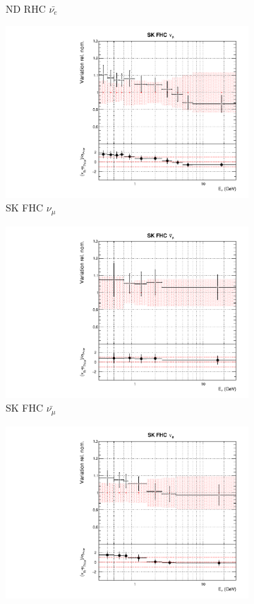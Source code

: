 \begin{figure}
\begin{subfigure}{0.24\textwidth}
  \caption{ND RHC $\bar{\nu_e}$}
\end{subfigure}
\begin{subfigure}{0.24\textwidth}
  \centering
  \includegraphics[width=0.95\linewidth]{figs/datflux8}
  \caption{SK FHC $\nu_{\mu}$}
\end{subfigure}
\begin{subfigure}{0.24\textwidth}
  \centering
  \includegraphics[width=0.95\linewidth]{figs/datflux9}
  \caption{SK FHC $\bar{\nu_{\mu}}$}
\end{subfigure}
\begin{subfigure}{0.24\textwidth}
  \centering
  \includegraphics[width=0.95\linewidth]{figs/datflux10}

\end{subfigure}
\end{figure}
